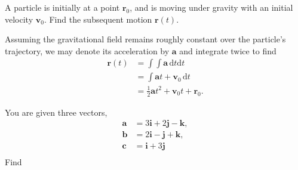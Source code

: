 \documentclass[../feynman-lectures-on-physics.tex]{subfiles}
\begin{document}
\begin{questions}
\question A particle is initially at a point $\mathbf{r}_0$, and is moving under gravity with an initial velocity $\mathbf{v}_0$. Find the subsequent motion $\mathbf{r}(t)$.

\begin{solution}
	Assuming the gravitational field remains roughly constant over the particle's trajectory, we may denote its acceleration by $\mathbf{a}$ and integrate twice to find
	\begin{align*}
		\mathbf{r}(t) &= \int\int\mathbf{a}\,\mathrm{d}t\mathrm{d}t \\
		&= \int \mathbf{a}t + \mathbf{v}_0\,\mathrm{d}t \\
		&= \frac{1}{2}\mathbf{a}t^2 + \mathbf{v}_0t + \mathbf{r}_0.
	\end{align*}
\end{solution}

\question You are given three vectors,
\begin{align*}
	\mathbf{a} &= 3\mathbf{i} + 2\mathbf{j} - \mathbf{k}, \\
	\mathbf{b} &= 2\mathbf{i} - \mathbf{j} + \mathbf{k}, \\
	\mathbf{c} &= \mathbf{i} + 3\mathbf{j} \\
\end{align*}
Find


\end{questions}
\end{document}
